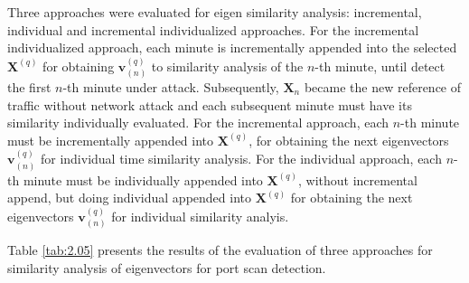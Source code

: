Three approaches were evaluated for eigen similarity analysis: incremental, individual and incremental individualized approaches. For the incremental individualized approach, each minute is incrementally appended into the selected $\pmb{X}^{(q)}$ for obtaining $\pmb{v}_{(n)}^{(q)}$ to similarity analysis of the $n$-th minute, until detect the first $n$-th minute under attack. Subsequently, $\pmb{X}_n$ became the new reference of traffic without network attack and each subsequent minute must have its similarity individually evaluated. For the incremental approach, each $n$-th minute must be incrementally appended into $\pmb{X}^{(q)}$, for obtaining the next eigenvectors $\pmb{v}_{(n)}^{(q)}$ for individual time similarity analysis. For the individual approach, each $n$-th minute must be individually appended into $\pmb{X}^{(q)}$, without incremental append, but doing individual appended into $\pmb{X}^{(q)}$ for obtaining the next eigenvectors $\pmb{v}_{(n)}^{(q)}$ for individual similarity analyis.

Table \ref{tab:2.05} presents the results of the evaluation of three approaches for similarity analysis of eigenvectors for port scan detection.

